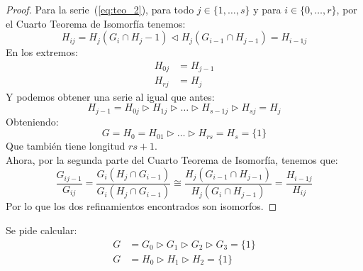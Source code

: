 \begin{teo}
\begin{proof}
        \noindent
        Para la serie~(\ref{eq:teo_2}), para todo $j\in \{1,\ldots,s\}$ y para $i \in \{0,\ldots, r\}$, por el Cuarto Teorema de Isomorfía tenemos:
        \begin{equation*}
            H_{ij} = H_j(G_i\cap H_j-1) \lhd H_j(G_{i-1}\cap H_{j-1}) = H_{i-1j}
        \end{equation*}
        En los extremos:
        \begin{align*}
            H_{0j} &= H_{j-1} \\
            H_{rj} &= H_j
        \end{align*}
        Y podemos obtener una serie al igual que antes:
        \begin{equation*}
            H_{j-1} = H_{0j} \rhd H_{1j} \rhd \ldots \rhd H_{s-1j} \rhd H_{sj} = H_j
        \end{equation*}
        Obteniendo:
        \begin{equation*}
            G=H_0=H_{01} \rhd \ldots \rhd H_{rs} = H_s = \{1\}
        \end{equation*}
        Que también tiene longitud $rs +1$.\\

        \noindent
        Ahora, por la segunda parte del Cuarto Teorema de Isomorfía, tenemos que:
        \begin{equation*}
            \dfrac{G_{ij-1}}{G_{ij}} = \dfrac{G_i(H_j\cap G_{i-1})}{G_i(H_j\cap G_{i-1})} \cong \dfrac{H_j(G_{i-1}\cap H_{j-1})}{H_j(G_i \cap H_{j-1})} = \dfrac{H_{i-1j}}{H_{ij}}
        \end{equation*}
        Por lo que los dos refinamientos encontrados son isomorfos.
    \end{proof}
\end{teo}

\begin{ejemplo}
    Se pide calcular:
    \begin{align*}
        G &= G_0 \rhd G_1 \rhd G_2 \rhd G_3 = \{1\} \\
        G &= H_0 \rhd H_1 \rhd H_2 = \{1\}
    \end{align*}
\end{ejemplo}

